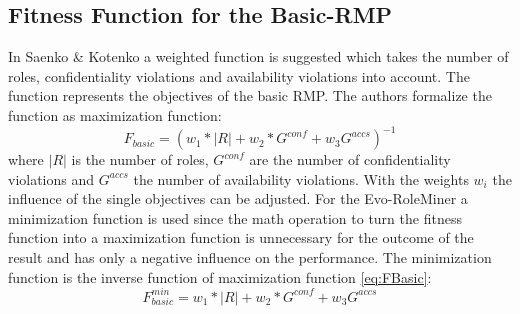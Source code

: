         \subsection{Fitness Function for the Basic-RMP}
        In Saenko \& Kotenko\cite{saenko2012design} a weighted function is suggested which takes the number of roles, confidentiality violations and availability violations into account. The function represents the objectives of the basic RMP. The authors formalize the function as maximization function:        
        \begin{equation}\label{eq:FBasic}
	        F_{basic} = (w_1 * |R| + w_2 * G^{conf} + w_3 G^{accs})^{-1}
	    \end{equation}	    
	    where $|R|$ is the number of roles, $G^{conf}$ are the number of confidentiality violations and $G^{accs}$ the number of availability violations. With the weights $w_i$ the influence of the single objectives can be adjusted. For the Evo-RoleMiner a minimization function is used since the math operation to turn the fitness function into a maximization function is unnecessary for the outcome of the result and has only a negative influence on the performance. The minimization function is the inverse function of maximization function \ref{eq:FBasic}:	    
		\begin{equation}\label{eq:FBasicMin}
		F_{basic}^{min} = w_1 * |R| + w_2 * G^{conf} + w_3 G^{accs}
		\end{equation}		
		
